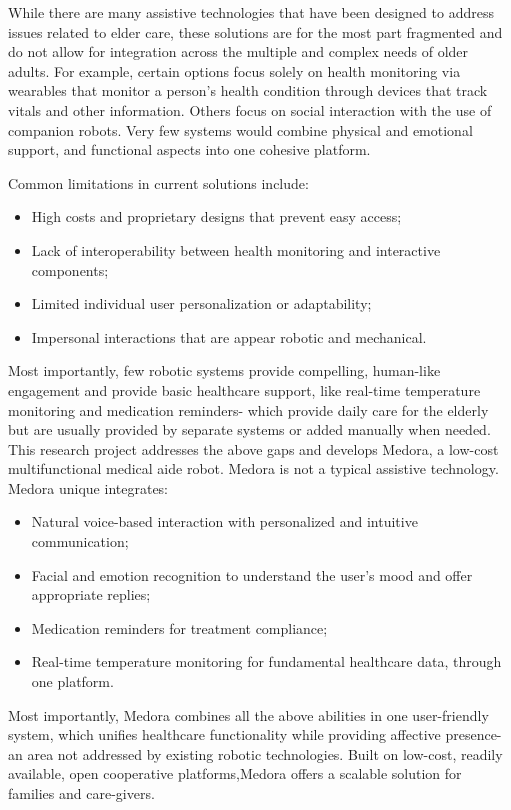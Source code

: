 While there are many assistive technologies that have been designed to address issues related to elder care, these solutions are for the most part fragmented and do not allow for integration across the multiple and complex needs of older adults. For example, certain options focus solely on health monitoring via wearables that monitor a person's health condition through devices that track vitals and other information. Others focus on social interaction with the use of companion robots. Very few systems would combine physical and emotional support, and functional aspects into one cohesive platform.

Common limitations in current solutions include:

\begin{itemize}[noitemsep]
    \item High costs and proprietary designs that prevent easy access;
    \item Lack of interoperability between health monitoring and interactive components;
    \item Limited individual user personalization or adaptability;
    \item Impersonal interactions that are appear robotic and mechanical.
\end{itemize}

Most importantly, few robotic systems provide compelling, human-like engagement and provide basic healthcare support, like real-time temperature monitoring and medication reminders- which provide daily care for the elderly but are usually provided by separate systems or added manually when needed. 
This research project addresses the above gaps and develops Medora, a low-cost multifunctional medical aide robot. Medora is not a typical assistive technology. Medora unique integrates:

\begin{itemize}[noitemsep]
    \item Natural voice-based interaction with personalized and intuitive communication;
    \item Facial and emotion recognition to understand the user's mood and offer appropriate replies;
    \item Medication reminders for treatment compliance;
    \item Real-time temperature monitoring for fundamental healthcare data, through one platform.
\end{itemize}

Most importantly, Medora combines all the above abilities in one user-friendly system, which unifies healthcare functionality while providing affective presence- an area not addressed by existing robotic technologies. Built on low-cost, readily available, open cooperative platforms,Medora offers a scalable solution for families and care-givers.



